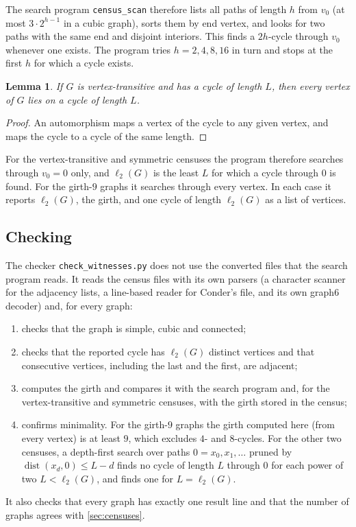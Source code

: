 \documentclass[11pt]{amsart}
\newtheorem{lemma}[theorem]{Lemma}
\theoremstyle{remark}
\newcommand{\code}[1]{\texttt{#1}}
\newcommand{\sv}{\ell_2}
\begin{document}
The search program \code{census\_scan} therefore lists all paths of length $h$
from $v_0$ (at most $3\cdot 2^{h-1}$ in a cubic graph), sorts them by end
vertex, and looks for two paths with the same end and disjoint interiors. This
finds a $2h$-cycle through $v_0$ whenever one exists. The program tries
$h=2,4,8,16$ in turn and stops at the first $h$ for which a cycle exists.

\begin{lemma}\label{lem:vt}
If $G$ is vertex-transitive and has a cycle of length $L$, then every vertex
of $G$ lies on a cycle of length $L$.
\end{lemma}

\begin{proof}
An automorphism maps a vertex of the cycle to any given vertex, and maps the
cycle to a cycle of the same length.
\end{proof}

For the vertex-transitive and symmetric censuses the program therefore searches
through $v_0=0$ only, and $\sv(G)$ is the least $L$ for which a cycle through
$0$ is found. For the girth-$9$ graphs it searches through every vertex. In
each case it reports $\sv(G)$, the girth, and one cycle of length $\sv(G)$ as
a list of vertices.

\subsection{Checking}
The checker \code{check\_witnesses.py} does not use the converted files that the search
program reads. It reads the census files with its own parsers (a character scanner for
the adjacency lists, a line-based reader for Conder's file, and its own graph6
decoder) and, for every graph:
\begin{enumerate}[label=(\roman*)]
\item checks that the graph is simple, cubic and connected;
\item checks that the reported cycle has $\sv(G)$ distinct vertices and that
consecutive vertices, including the last and the first, are adjacent;
\item computes the girth and compares it with the search program and, for the
vertex-transitive and symmetric censuses, with the girth stored in the census;
\item confirms minimality. For the girth-$9$ graphs the girth computed here
(from every vertex) is at least $9$, which excludes $4$- and $8$-cycles. For the
other two censuses, a depth-first search over paths $0=x_0,x_1,\dots$ pruned by
$\operatorname{dist}(x_d,0)\le L-d$ finds no cycle of length $L$ through $0$ for
each power of two $L<\sv(G)$, and finds one for $L=\sv(G)$.
\end{enumerate}
It also checks that every graph has exactly one result line and that the number
of graphs agrees with \cref{sec:censuses}.
\end{document}

